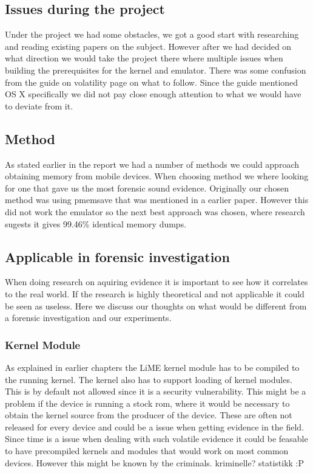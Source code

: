 \subsection{Issues during the project}
Under the project we had some obstacles, we got a good start with researching and 
reading existing papers on the subject. However after we had decided on what 
direction we would take the project there where multiple issues when building the 
prerequisites for the kernel and emulator. There was some confusion from the guide 
on volatility page on what to follow. Since the guide mentioned OS X specifically 
we did not pay close enough attention to what we would have to deviate from it.
\subsection{Method}
As stated earlier in the report we had a number of methods we could approach 
obtaining memory from mobile devices. When choosing method we where looking for one 
that gave us the most forensic sound evidence. Originally our chosen method was 
using pmemsave %
that was mentioned in a earlier paper\cite{acq_vol_android_mem}. However this did 
not work the emulator so the next best approach was chosen, where research sugests 
it gives 99.46\% identical memory dumps\cite{acq_vol_android_mem}.
\subsection{Applicable in forensic investigation}
When doing research on aquiring evidence it is important to see how it correlates 
to the real world. If the research is highly theoretical and not applicable it 
could be seen as useless. Here we discuss our thoughts on what would be different 
from a forensic investigation and our experiments.
\subsubsection{Kernel Module}
As explained in earlier chapters the LiME kernel module has to be compiled to the 
running kernel. The kernel also has to support loading of kernel modules. This is 
by default not allowed since it is a security vulnerability. This might be a 
problem if the device is running a stock rom, where it would be necessary to obtain 
the kernel source from the producer of the device. These are often not released for 
every device and could be a issue when getting evidence in the field. Since time is 
a issue when dealing with such volatile evidence it could be feasable to have 
precompiled kernels and modules that would work on most common devices. However 
this might be known by the criminals. %
kriminelle? statistikk :P